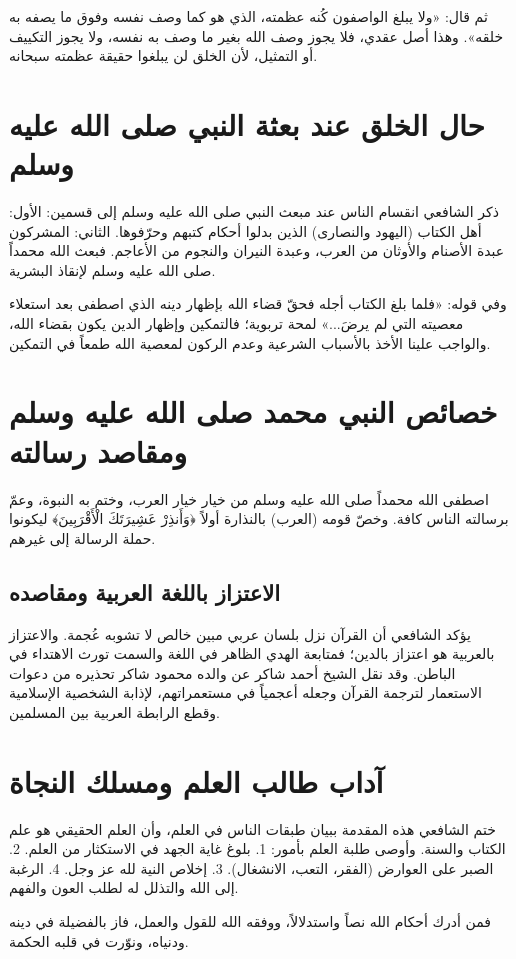 ثم قال: «ولا يبلغ الواصفون كُنه عظمته، الذي هو كما وصف نفسه وفوق ما يصفه به خلقه». وهذا أصل عقدي، فلا يجوز وصف الله بغير ما وصف به نفسه، ولا يجوز التكييف أو التمثيل، لأن الخلق لن يبلغوا حقيقة عظمته سبحانه.

\section{حال الخلق عند بعثة النبي صلى الله عليه وسلم}
ذكر الشافعي انقسام الناس عند مبعث النبي صلى الله عليه وسلم إلى قسمين:
الأول: أهل الكتاب (اليهود والنصارى) الذين بدلوا أحكام كتبهم وحرّفوها.
الثاني: المشركون عبدة الأصنام والأوثان من العرب، وعبدة النيران والنجوم من الأعاجم. فبعث الله محمداً صلى الله عليه وسلم لإنقاذ البشرية.

وفي قوله: «فلما بلغ الكتاب أجله فحقّ قضاء الله بإظهار دينه الذي اصطفى بعد استعلاء معصيته التي لم يرضَ...» لمحة تربوية؛ فالتمكين وإظهار الدين يكون بقضاء الله، والواجب علينا الأخذ بالأسباب الشرعية وعدم الركون لمعصية الله طمعاً في التمكين.

\section{خصائص النبي محمد صلى الله عليه وسلم ومقاصد رسالته}
اصطفى الله محمداً صلى الله عليه وسلم من خيار خيار العرب، وختم به النبوة، وعمّ برسالته الناس كافة. وخصّ قومه (العرب) بالنذارة أولاً ﴿وَأَنذِرْ عَشِيرَتَكَ الْأَقْرَبِينَ﴾ ليكونوا حملة الرسالة إلى غيرهم.

\subsection{الاعتزاز باللغة العربية ومقاصده}
يؤكد الشافعي أن القرآن نزل بلسان عربي مبين خالص لا تشوبه عُجمة. والاعتزاز بالعربية هو اعتزاز بالدين؛ فمتابعة الهدي الظاهر في اللغة والسمت تورث الاهتداء في الباطن. وقد نقل الشيخ أحمد شاكر عن والده محمود شاكر تحذيره من دعوات الاستعمار لترجمة القرآن وجعله أعجمياً في مستعمراتهم، لإذابة الشخصية الإسلامية وقطع الرابطة العربية بين المسلمين.

\section{آداب طالب العلم ومسلك النجاة}
ختم الشافعي هذه المقدمة ببيان طبقات الناس في العلم، وأن العلم الحقيقي هو علم الكتاب والسنة. وأوصى طلبة العلم بأمور:
1. بلوغ غاية الجهد في الاستكثار من العلم.
2. الصبر على العوارض (الفقر، التعب، الانشغال).
3. إخلاص النية لله عز وجل.
4. الرغبة إلى الله والتذلل له لطلب العون والفهم.

فمن أدرك أحكام الله نصاً واستدلالاً، ووفقه الله للقول والعمل، فاز بالفضيلة في دينه ودنياه، ونوّرت في قلبه الحكمة.